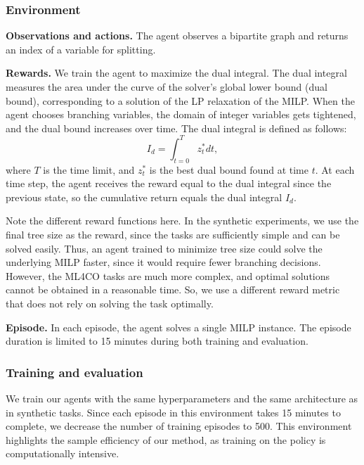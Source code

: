 \documentclass[preprint,12pt]{elsarticle} %
\theoremstyle{plain}
\theoremstyle{definition}
\theoremstyle{remark}
\begin{document}
\subsubsection{Environment}

\textbf{Observations and actions.} The agent observes a bipartite graph and returns an index of a variable for splitting. 

\textbf{Rewards.} We train the agent to maximize the dual integral. The dual integral measures the area under the curve of the solver’s global lower bound (dual bound), corresponding to a solution of the LP relaxation of the MILP. When the agent chooses branching variables, the domain of integer variables gets tightened, and the dual bound increases over time. The dual integral is defined as follows:
\begin{equation*}
I_d = \int_{t=0}^T {z_{t}^{*} dt},
\end{equation*}
where $T$ is the time limit, and $z_{t}^{*}$ is the best dual bound found at time $t$. At each time step, the agent receives the reward equal to the dual integral since the previous state, so the cumulative return equals the dual integral $I_d$.

Note the different reward functions here. In the synthetic experiments, we use the final tree size as the reward, since the tasks are sufficiently simple and can be solved easily. Thus, an agent trained to minimize tree size could solve the underlying MILP faster, since it would require fewer branching decisions. However, the ML4CO tasks are much more complex, and optimal solutions cannot be obtained in a reasonable time. So, we use a different reward metric that does not rely on solving the task optimally. 

\textbf{Episode.} In each episode, the agent solves a single MILP instance. The episode duration is limited to 15 minutes during both training and evaluation. 

\subsubsection{Training and evaluation}

We train our agents with the same hyperparameters and the same architecture as in synthetic tasks. Since each episode in this environment takes 15 minutes to complete, we decrease the number of training episodes to 500. This environment highlights the sample efficiency of our method, as training on the policy is computationally intensive.
\end{document}
